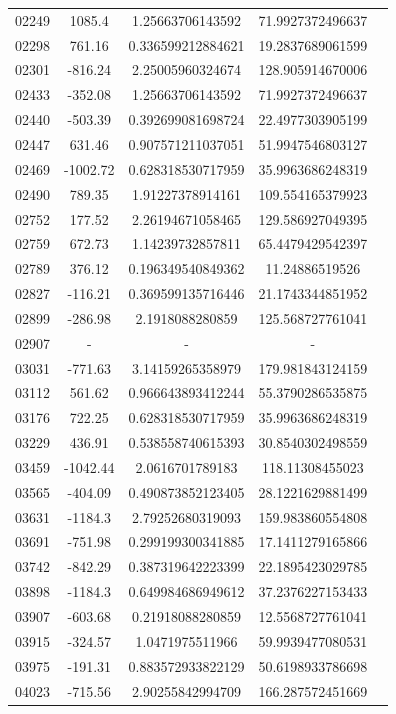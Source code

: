 {\begin{longtable}{ccccc}
02249 & 1085.4 & 1.25663706143592 & 71.9927372496637 \\
02298 & 761.16 & 0.336599212884621 & 19.2837689061599 \\
02301 & -816.24 & 2.25005960324674 & 128.905914670006 \\
02433 & -352.08 & 1.25663706143592 & 71.9927372496637 \\
02440 & -503.39 & 0.392699081698724 & 22.4977303905199 \\
02447 & 631.46 & 0.907571211037051 & 51.9947546803127 \\
02469 & -1002.72 & 0.628318530717959 & 35.9963686248319 \\
02490 & 789.35 & 1.91227378914161 & 109.554165379923 \\
02752 & 177.52 & 2.26194671058465 & 129.586927049395 \\
02759 & 672.73 & 1.14239732857811 & 65.4479429542397 \\
02789 & 376.12 & 0.196349540849362 & 11.24886519526 \\
02827 & -116.21 & 0.369599135716446 & 21.1743344851952 \\
02899 & -286.98 & 2.1918088280859 & 125.568727761041 \\
02907 & - & - &  -  \\
03031 & -771.63 & 3.14159265358979 & 179.981843124159 \\
03112 & 561.62 & 0.966643893412244 & 55.3790286535875 \\
03176 & 722.25 & 0.628318530717959 & 35.9963686248319 \\
03229 & 436.91 & 0.538558740615393 & 30.8540302498559 \\
03459 & -1042.44 & 2.0616701789183 & 118.11308455023 \\
03565 & -404.09 & 0.490873852123405 & 28.1221629881499 \\
03631 & -1184.3 & 2.79252680319093 & 159.983860554808 \\
03691 & -751.98 & 0.299199300341885 & 17.1411279165866 \\
03742 & -842.29 & 0.387319642223399 & 22.1895423029785 \\
03898 & -1184.3 & 0.649984686949612 & 37.2376227153433 \\
03907 & -603.68 & 0.21918088280859 & 12.5568727761041 \\
03915 & -324.57 & 1.0471975511966 & 59.9939477080531 \\
03975 & -191.31 & 0.883572933822129 & 50.6198933786698 \\
04023 & -715.56 & 2.90255842994709 & 166.287572451669 \\

\end{longtable}}
